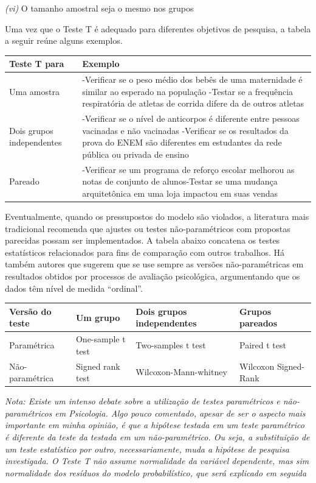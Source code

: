 \documentclass[
]{book}
\begin{document}
\emph{(vi)} O tamanho amostral seja o mesmo nos grupos

Uma vez que o Teste T é adequado para diferentes objetivos de pesquisa, a tabela a seguir reúne alguns exemplos.

\begin{longtable}[]{@{}
  >{\raggedright\arraybackslash}p{}
  >{\raggedright\arraybackslash}p{}@{}}
\toprule
Teste T para & Exemplo \\
\midrule
\endhead
Uma amostra & -Verificar se o peso médio dos bebês de uma maternidade é similar ao esperado na população -Testar se a frequência respiratória de atletas de corrida difere da de outros atletas \\
Dois grupos independentes & -Verificar se o nível de anticorpos é diferente entre pessoas vacinadas e não vacinadas -Verificar se os resultados da prova do ENEM são diferentes em estudantes da rede pública ou privada de ensino \\
Pareado & -Verificar se um programa de reforço escolar melhorou as notas de conjunto de alunos-Testar se uma mudança arquitetônica em uma loja impactou em suas vendas \\
\bottomrule
\end{longtable}

Eventualmente, quando os pressupostos do modelo são violados, a literatura mais tradicional recomenda que ajustes ou testes não-paramétricos com propostas parecidas possam ser implementados. A tabela abaixo concatena os testes estatísticos relacionados para fins de comparação com outros trabalhos. Há também autores que sugerem que se use sempre as versões não-paramétricas em resultados obtidos por processos de avaliação psicológica, argumentando que os dados têm nível de medida ``ordinal''.

\begin{longtable}[]{@{}llll@{}}
\toprule
Versão do teste & Um grupo & Dois grupos independentes & Grupos pareados \\
\midrule
\endhead
Paramétrica & One-sample t test & Two-samples t test & Paired t test \\
Não-paramétrica & Signed rank test & Wilcoxon-Mann-whitney & Wilcoxon Signed-Rank \\
\bottomrule
\end{longtable}

\emph{Nota: Existe um intenso debate sobre a utilização de testes paramétricos e não-paramétricos em Psicologia. Algo pouco comentado, apesar de ser o aspecto mais importante em minha opinião, é que a hipótese testada em um teste paramétrico é diferente da teste da testada em um não-paramétrico. Ou seja, a substituição de um teste estatístico por outro, necessariamente, muda a hipótese de pesquisa investigada. O Teste T não assume normalidade da variável dependente, mas sim normalidade dos resíduos do modelo probabilístico, que será explicado em seguida}
\end{document}
